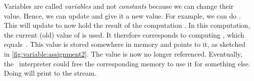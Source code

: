 %
Variables are called \emph{variables} and not \emph{constants} because we can change their value.
Hence, we can update  and give it a new value.
For example, we can do .
This will update  to now hold the result of the computation .
In this computation, the current (old) value of  is used.
It therefore corresponds to computing , which equals~.
This value is stored somewhere in memory and  points to it, as sketched in \cref{fig:variable:assignment2}.
The value  is now no longer referenced.
Eventually, the \python\ interpreter could free the corresponding memory to use it for something else.
Doing  will print  to the  stream.

